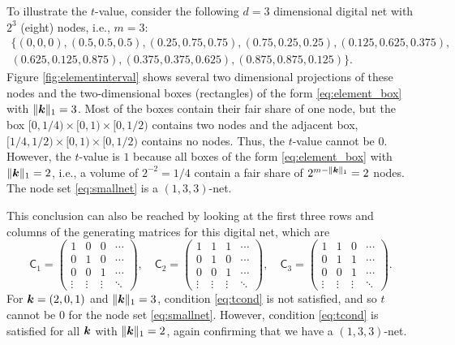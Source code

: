 \documentclass{svproc}
\begin{document}
To illustrate the $t$-value, consider the following $d=3$ dimensional digital net with $2^3$ (eight) nodes, i.e., $m = 3$:
\begin{multline} \label{eq:smallnet}
	\{(0, 0,   0),
	(0.5,   0.5,   0.5  ),
	(0.25,  0.75,  0.75 ),
	(0.75,  0.25,  0.25 ),
	(0.125, 0.625, 0.375),\\
	(0.625, 0.125, 0.875),
	(0.375, 0.375, 0.625),
	(0.875, 0.875, 0.125)\}.
\end{multline}
Figure \ref{fig:elementinterval} shows several two dimensional projections of these nodes and the two-dimensional boxes (rectangles) of the form \eqref{eq:element_box} with $\lVert{\boldsymbol{k}}\rVert_1 = 3$.  Most of the boxes contain their fair share of one node, but the box $[0,1/4) \times [0,1) \times [0,1/2)$ contains two nodes and the adjacent box, $[1/4,1/2) \times [0,1) \times [0,1/2)$ contains no nodes.  Thus, the $t$-value cannot be $0$.  However, the $t$-value is $1$ because all boxes of the form  \eqref{eq:element_box} with $\lVert{\boldsymbol{k}}\rVert_1 = 2$, i.e., a volume of $2^{-2} = 1/4$ contain a fair share of $2^{m- \lVert {\boldsymbol{k}} \rVert_1} = 2$ nodes.  The node set \eqref{eq:smallnet} is a $(1,3,3)$-net.

This conclusion can also be reached by looking at the first three rows and columns of the generating matrices for this digital net, which are
\begin{equation*}
	\mathsf{C}_1 = \begin{pmatrix}
		1 & 0 & 0 & \cdots \\ 0 & 1 & 0 & \cdots \\ 0 & 0 & 1 & \cdots \\ \vdots & \vdots & \vdots & \ddots
	\end{pmatrix}, \quad
	\mathsf{C}_2 = \begin{pmatrix}
		1 & 1 & 1 & \cdots \\ 0 & 1 & 0 & \cdots \\ 0 & 0 & 1 & \cdots \\ \vdots & \vdots & \vdots & \ddots
	\end{pmatrix}, \quad
	\mathsf{C}_3 = \begin{pmatrix}
	1 & 1 & 0 & \cdots \\ 0 & 1 & 1 & \cdots \\ 0 & 0 & 1 & \cdots \\ \vdots & \vdots & \vdots & \ddots
\end{pmatrix}.
\end{equation*}
For ${\boldsymbol{k}} = (2, 0, 1)$ and $\lVert {\boldsymbol{k}} \rVert_1 = 3$, condition \eqref{eq:tcond} is not satisfied, and so $t$ cannot be $0$ for the node set  \eqref{eq:smallnet}.  However, condition \eqref{eq:tcond} is satisfied for all ${\boldsymbol{k}}$ with $\lVert {\boldsymbol{k}} \rVert_1 = 2$, again confirming that we have a $(1,3,3)$-net.
\end{document}
